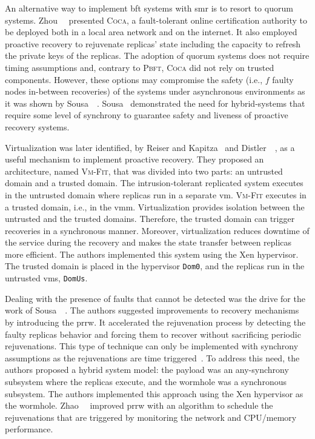 An alternative way to implement \gls{bft} systems with \gls{smr} is to resort to quorum systems.
Zhou~\etal{}~\cite{Zhou:2002} presented \textsc{Coca}, a fault-tolerant online certification authority to be deployed both in a local area network and on the internet.
It also employed proactive recovery to rejuvenate replicas' state including the capacity to refresh the private keys of the replicas.
The adoption of quorum systems does not require timing assumptions and, contrary to \textsc{Pbft}, \textsc{Coca} did not rely on trusted components.
However, these options may compromise the safety (i.e., $f$ faulty nodes in-between recoveries) of the systems under asynchronous environments as it was shown by Sousa~\etal{}~\cite{Sousa:2007}. 
Sousa~\etal{} demonstrated the need for hybrid-systems that require some level of synchrony to guarantee safety and liveness of proactive recovery systems.


Virtualization was later identified, by Reiser and Kapitza~\cite{Reiser:2007} and Distler~\etal{}~\cite{Distler:2008}, as a useful mechanism to implement proactive recovery.
They proposed an architecture, named \textsc{Vm-Fit}, that was divided into two parts: an untrusted domain and a trusted domain.
The intrusion-tolerant replicated system executes in the untrusted domain where replicas run in a separate \gls{vm}. 
\textsc{Vm-Fit} executes in a trusted domain, i.e., in the \gls{vmm}. 
Virtualization provides isolation between the untrusted and the trusted domains. 
Therefore, the trusted domain can trigger recoveries in a synchronous manner. 
Moreover, virtualization reduces downtime of the service during the recovery and makes the state transfer between replicas more efficient. 
The authors implemented this system using the Xen hypervisor.
The trusted domain is placed in the hypervisor \texttt{Dom0}, and the replicas run in the untrusted \glspl{vm}, \texttt{DomUs}.

Dealing with the presence of faults that cannot be detected was the drive for the work of Sousa~\etal{}~\cite{Sousa:2010}.
The authors suggested improvements to recovery mechanisms by introducing the \gls{prrw}. 
It accelerated the rejuvenation process by detecting the faulty replicas behavior and forcing them to recover without sacrificing periodic rejuvenations. 
This type of technique can only be implemented with synchrony assumptions as the rejuvenations are time triggered~\cite{Sousa:2005}. 
To address this need, the authors proposed a hybrid system model: the payload was an any-synchrony subsystem where the replicas execute, and the wormhole was a synchronous subsystem. 
The authors implemented this approach using the Xen hypervisor as the wormhole. 
Zhao~\etal{}~\cite{Zhao:2012} improved \gls{prrw} with an algorithm to schedule the rejuvenations that are triggered by monitoring the network and CPU/memory performance.


